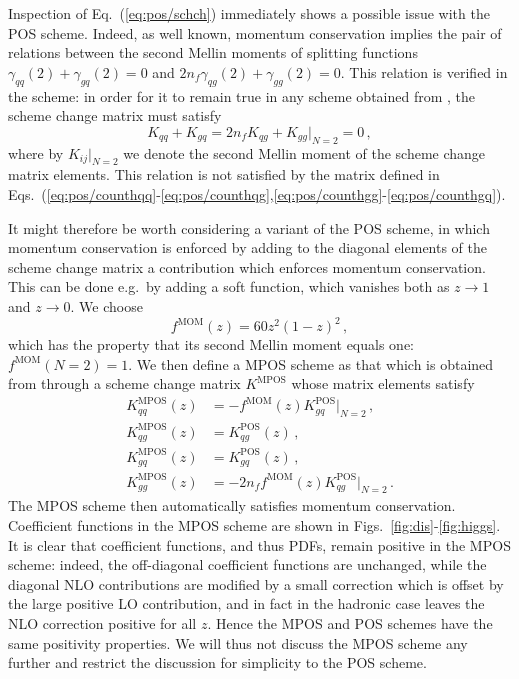 Inspection of Eq.~(\ref{eq:pos/schch}) immediately shows a possible issue
with the POS scheme. Indeed, as well known, momentum conservation
implies the pair of relations between the second Mellin moments of splitting
functions $\gamma_{qq}(2)+\gamma_{gq}(2)=0$ and
 $2n_f\gamma_{qg}(2)+\gamma_{gg}(2)=0$. This relation is verified in the
\msbar{} scheme:  in order for it to remain true  in any scheme obtained
from \msbar{}, the scheme change matrix must satisfy
\begin{equation}\label{eq:pos/momcons}
  K_{qq}+K_{gq}=2n_fK_{qg}+K_{gg}\Big|_{N=2}=0 \,,
\end{equation}
where by $K_{ij}\Big|_{N=2}$ we denote the second Mellin moment of the
scheme change matrix elements. This relation is not satisfied by the matrix defined in
Eqs.~(\ref{eq:pos/counthqq}-\ref{eq:pos/counthqg},\ref{eq:pos/counthgg}-\ref{eq:pos/counthgq}).

It might therefore be worth considering a variant of the POS scheme,
in which momentum conservation is enforced by adding to the diagonal
elements of the scheme change matrix a contribution which enforces
momentum conservation. This can be done e.g.\ by adding a soft
function, which vanishes both as $z\to1$ and $z \to0$. We choose
\begin{equation}\label{eq:pos/fmom}
  f^{\textrm{MOM}}(z)= 60 z^2(1-z)^2\,,
\end{equation}
which has the property that its second Mellin moment equals one:
$f^{\textrm{MOM}}(N=2)=1$. We then define a MPOS scheme as that which is obtained
from \msbar{} through a scheme change matrix $K^{\textrm{MPOS}}$ whose
matrix elements satisfy
\begin{align}
  \label{eq:pos/mposqq}
  K^{\textrm{MPOS}}_{qq}(z)&= - f^{\textrm{MOM}}(z) K^{\textrm{POS}}_{gq}\Big|_{N=2} \,,\\
  \label{eq:pos/mposqg}
  K^{\textrm{MPOS}}_{qg}(z)&= K^{\textrm{POS}}_{qg}(z) \,,\\
  \label{eq:pos/mposgq}
  K^{\textrm{MPOS}}_{gq}(z)&= K^{\textrm{POS}}_{gq}(z) \,,\\
  \label{eq:pos/mposgg}
  K^{\textrm{MPOS}}_{gg}(z)&= -2n_f f^{\textrm{MOM}}(z) K^{\textrm{POS}}_{qg}\Big|_{N=2} \,.
\end{align}
The MPOS scheme then automatically satisfies momentum
conservation. Coefficient functions in the MPOS scheme are shown in
Figs.~\ref{fig:dis}-\ref{fig:higgs}. It is clear that coefficient
functions, and thus PDFs, remain
positive in the MPOS scheme: indeed, the off-diagonal coefficient
functions are unchanged, while the diagonal NLO contributions are
modified by a small correction which is offset by the large positive
LO contribution, and in fact in the hadronic case leaves the NLO
correction positive for all $z$. Hence the MPOS and POS schemes have the same
positivity properties. We will thus not discuss the MPOS scheme
any further and restrict the discussion for simplicity to the POS
scheme.

